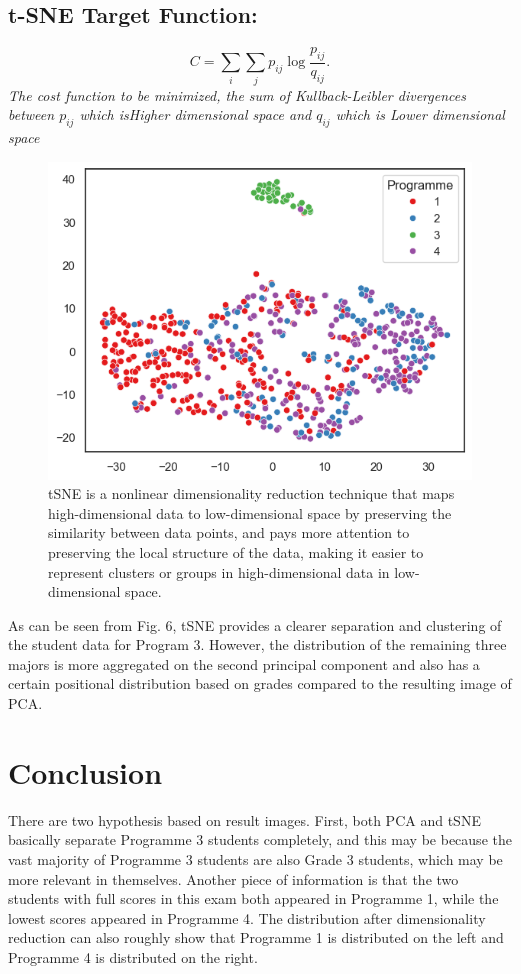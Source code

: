 \documentclass[twocolumn]{IEEEtran}
\begin{document}
\subsection*{t-SNE Target Function:}
\begin{equation}
    C = \sum_i \sum_j p_{ij} \log \frac{p_{ij}}{q_{ij}}.
\end{equation}
\textit{The cost function to be minimized, the sum of Kullback-Leibler divergences between \( p_{ij} \) which isHigher dimensional space and \( q_{ij} \) which is Lower dimensional space}

\begin{figure}[H]
    \centering
    \includegraphics*[scale=0.5]{./img/tsne.png}
    \caption{tSNE is a nonlinear dimensionality reduction technique that maps high-dimensional data to low-dimensional space by preserving the similarity between data points, and pays more attention to preserving the local structure of the data, making it easier to represent clusters or groups in high-dimensional data in low-dimensional space.}
\end{figure}
As can be seen from Fig. 6, tSNE provides a clearer separation and clustering of the student data for Program 3. However, the distribution of the remaining three majors is more aggregated on the second principal component and also has a certain positional distribution based on grades compared to the resulting image of PCA.
\section{Conclusion}
There are two hypothesis based on result images. First, both PCA and tSNE basically separate Programme 3 students completely, and this may be because the vast majority of Programme 3 students are also Grade 3 students, which may be more relevant in themselves. Another piece of information is that the two students with full scores in this exam both appeared in Programme 1, while the lowest scores appeared in Programme 4. The distribution after dimensionality reduction can also roughly show that Programme 1 is distributed on the left and Programme 4 is distributed on the right.
\end{document}
